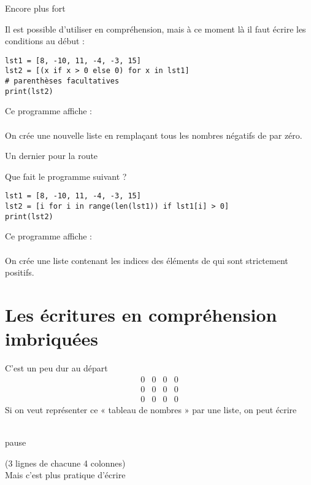 \documentclass[10pt]{beamer}
\begin{document}
    \begin{frame}[fragile]{Encore plus fort}
        \pause

        Il est possible d'utiliser  en compréhension, mais à ce moment là il faut écrire les conditions au début :\pause


        \begin{verbatim}
lst1 = [8, -10, 11, -4, -3, 15]
lst2 = [(x if x > 0 else 0) for x in lst1]
# parenthèses facultatives
print(lst2)
        \end{verbatim}
        \pause

        Ce programme affiche :\\\pause
        \pythoninline{[8, 0, 11, 0, 0, 15]}\\\pause
        On crée une nouvelle liste en remplaçant tous les nombres négatifs de  par zéro.
    \end{frame}

    \begin{frame}[fragile]{Un dernier pour la route}
        \pause

        Que fait le programme suivant ?\pause

        \begin{verbatim}
lst1 = [8, -10, 11, -4, -3, 15]
lst2 = [i for i in range(len(lst1)) if lst1[i] > 0]
print(lst2)
        \end{verbatim}
        \pause

        Ce programme affiche :\\\pause
        \pythoninline{[0, 2, 5]}\\\pause
        On crée une liste contenant les indices des éléments de  qui sont strictement positifs.
    \end{frame}


    \section{Les écritures en compréhension imbriquées}


    \begin{frame}{C'est un peu dur au départ}
        \pause
        $$\begin{matrix}
              0 & 0 & 0 & 0 \\0 & 0 & 0 & 0 \\0 & 0 & 0 & 0
        \end{matrix}$$\pause
        Si on veut représenter ce « tableau de nombres » par une liste, on peut écrire\\ \pause

        \\pause

        (3 lignes de chacune 4 colonnes)\\

        Mais c'est plus pratique d'écrire\\\pause

    \end{frame}
\end{document}
